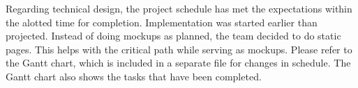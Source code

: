 

Regarding technical design, the project schedule has met the expectations within the alotted time for completion. Implementation was started earlier than projected. Instead of doing mockups as planned, the team decided to do static pages. This helps with the critical path while serving as mockups. Please refer to the Gantt chart, which is included in a separate file for changes in schedule. The Gantt chart also shows the tasks that have been completed. 



